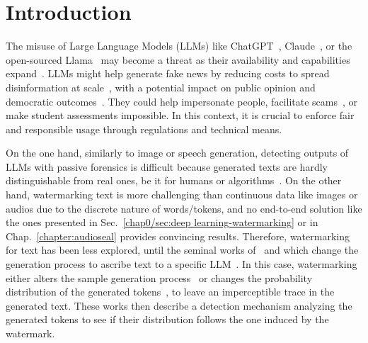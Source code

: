 
\section{Introduction}

The misuse of Large Language Models (LLMs) like ChatGPT~\citep{chatgpt2022}, Clau\-de~\citep{claude}, or the open-sourced Llama~\citep{touvron2023llama} may become a threat as their availability and capabilities expand~\citep{weidinger2022taxonomy, crothers2022machine, cardenuto2023age}.
LLMs might help generate fake news by reducing costs to spread disinformation at scale~\citep{kertysova2018artificial, kreps2022all}, with a potential impact on public opinion and democratic outcomes~\citep{kuvsen2018politics}.
They could help impersonate people, facilitate scams~\citep{ryan2023junk}, or make student assessments impossible.
In this context, it is crucial to enforce fair and responsible usage through regulations and technical means.

On the one hand, similarly to image or speech generation, detecting outputs of LLMs with passive forensics is difficult because generated texts are hardly distinguishable from real ones, be it for humans or algorithms~\citep{ippolito2019automatic, mitchell2023detectgpt}.
On the other hand, watermarking text is more challenging than continuous data like images or audios due to the discrete nature of words/tokens, and no end-to-end solution like the ones presented in Sec.~\ref{chap0/sec:deep learning-watermarking} or in Chap.~\ref{chapter:audioseal} provides convincing results.
Therefore, watermarking for text has been less explored, until the seminal works of~\citet{kirchenbauer2023watermark} and \citet{aaronson2023watermarking} which change the generation process to ascribe text to a specific LLM~\citep{aaronson2023watermarking,kirchenbauer2023watermark,kirchenbauer2023reliability,christ2023undetectable}.
In this case, watermarking either alters the sample generation process~\citep{aaronson2023watermarking,christ2023undetectable} or changes the probability distribution of the generated tokens~\citep{kirchenbauer2023watermark, zhao2023provable}, to leave an imperceptible trace in the generated text.
These works then describe a detection mechanism analyzing the generated tokens to see if their distribution follows the one induced by the watermark. 

